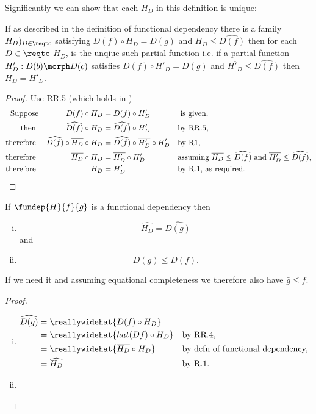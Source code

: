 Significantly we can show that 
each $H_D$ in this definition is unique:
\begin{lemma}
If as described in the definition of functional dependency there is
a family $H_D)_{D \in \reqtc}$
satisfying $D(f) \circ H_D = D(g)$ 
and $\overline{H_D}\leq \widehat{D(f)}$
then for each $D \in \reqtc$ $H_D$, is the unqiue such partial function 
i.e. if  a partial function $H'_D: D(b) \morph D(c)$
satisfies
$D(f) \circ H'_D = D(g)$ and $\overline{H'_D}\leq \widehat{D(f)}$
then $H_D = H'_D$.
\end{lemma}
\begin{proof}
Use RR.5 (which holds in \Par) 
\begin{align*}
\mbox{Suppose}
  &&D(f) \circ H_D 
  &= D(f) \circ H'_D 
  && \mbox{ is given,}\\
\mbox{then }
  &&\widehat{D(f)} \circ H_D 
  &= \widehat{D(f)} \circ H'_D  
  && \mbox{by RR.5,}\\
\mbox{therefore }
  &&\widehat{D(f)} \circ \overline{H_D} \circ H_D 
  &=  \widehat{D(f)} \circ\overline{H'_D} \circ H'_D  
  && \mbox{by R1,}      \\
\mbox{therefore }
  &&\overline{H_D} \circ H_D &=  \overline{H'_D} \circ H'_D  
  && \mbox{\parbox[t]{6cm}{assuming $\overline{H_D}\leq \widehat{D(f)}$ and $\overline{H'_D}\leq \widehat{D(f)}$,}}  \\
\mbox{therefore }
  &&H_D &= H'_D
  && \mbox{by R.1, as required.}
\end{align*}
\end{proof}

\begin{lemma}

If $\fundep{H}{f}{g}$ is a functional dependency then
\begin{enumerate}[(i)]
\item $$\widehat{H_D}=\widehat{D(g)}$$
and
\item $$\overline{D(g)} \leq \overline{D(f)}.$$
\end{enumerate}
\begin{aside}
If we need it and assuming equational completeness we therefore also have
$ \bar{g} \leq \bar{f}$. 
\end{aside}
\end{lemma}
\begin{proof}
\begin{enumerate}[(i)]
    \item
\begin{align*}
\widehat{D(g)} &= \reallywidehat{D(f) \circ H_D} \\
               &= \reallywidehat{hat({D{f})} \circ H_D} &&\mbox{by RR.4,}\\               
               &= \reallywidehat{\overline{H_D} \circ H_D} &&\mbox{by defn of functional dependency,}\\
               &= \widehat{ H_D} &&\mbox{by R.1.}\\
\end{align*}
\item 
{}
\end{enumerate}
\end{proof}

